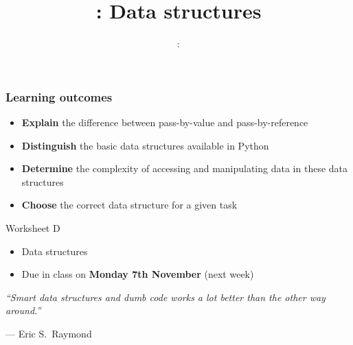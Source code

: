 \usepackage{../../beamerthemeFalmouthGamesAcademy}
\usepackage{multimedia}
\graphicspath{ {../../} }

\lstset{language=Python
}

\usepackage[normalem]{ulem}
\usepackage{wasysym}

\usepackage{pdfpages}

\usetikzlibrary{arrows,automata}
\usetikzlibrary{tikzmark,calc}




\title{\sessionnumber: Data structures}
\subtitle{\modulecode: \moduletitle}

\frame{\titlepage} 

\begin{frame}
	\frametitle{Learning outcomes}
	\begin{itemize}
		\item \textbf{Explain} the difference between pass-by-value and pass-by-reference
		\item \textbf{Distinguish} the basic data structures available in Python
		\item \textbf{Determine} the complexity of accessing and manipulating data in these data structures
		\item \textbf{Choose} the correct data structure for a given task
	\end{itemize}
\end{frame}

\begin{frame}{Worksheet D}
	\begin{itemize}
		\item Data structures
		\item Due in class on \textbf{Monday 7th November} (next week)
	\end{itemize}
\end{frame}






\begin{frame}
	\begin{center}
		\textit{``Smart data structures and dumb code works a lot better than the other way around.''}
		
		--- Eric S.\ Raymond
	\end{center}
\end{frame}



